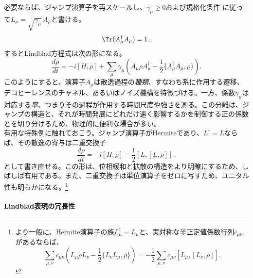 \documentclass[a4paper,11pt,oneside]{article}
\theoremstyle{definition}
\numberwithin{equation}{section}
\begin{document}
必要ならば、ジャンプ演算子を再スケールし、$\gamma_\mu\ge 0$および規格化条件
に従って$L_\mu=\sqrt{\gamma_\mu}\,A_\mu$と書ける。
\begin{equation}
\Tr(A^{\dagger}_{\mu}A_{\mu})=1 \,.
\end{equation}
するとLindblad方程式は次の形になる。
\begin{equation}
\frac{d\rho}{dt}
=
-i[H,\rho]
+
\sum_\mu \gamma_\mu
\left(
A_\mu \rho A_\mu^\dagger
-\frac12 \{A_\mu^\dagger A_\mu,\rho\}
\right) .
\end{equation}
このようにすると、演算子$A_\mu$は散逸過程の\textit{種類}、すなわち系に作用する遷移、デコヒーレンスのチャネル、あるいはノイズ機構を特徴づける。一方、係数$\gamma_\mu$は対応する\textit{率}、つまりその過程が作用する時間尺度や強さを測る。この分離は、ジャンプの構造と、それが時間発展にどれだけ速く影響するかを制御する正の係数とを切り分けるため、物理的に便利な場合が多い。\\





有用な特殊例に触れておこう。ジャンプ演算子がHermiteであり、$  L ^\dagger = L  $ならば、その散逸の寄与は二重交換子
\begin{equation}\label{doublecommutator}
\frac{d\rho}{dt}
=
-i[H,\rho]
-\frac12 
\left[L ,[L ,\rho]\right]\,.
\end{equation}
として書き直せる。この形は、位相緩和と拡散の構造をより明瞭にするため、しばしば有用である。また、二重交換子は単位演算子をゼロに写すため、ユニタル性も明らかになる。\footnote{より一般に、Hermite演算子の族$L_\mu^\dagger=L_\mu$と、実対称な半正定値係数行列$c_{\mu\nu}$があるならば、
\begin{equation}
\sum_{\mu,\nu} c_{\mu\nu}
\left(
L_\mu \rho L_\nu - \frac12\{L_\nu L_\mu,\rho\}
\right)
=
-\frac12
\sum_{\mu,\nu} c_{\mu\nu}[L_\mu,[L_\nu,\rho]] .
\end{equation}}




\paragraph{Lindblad表現の冗長性}
\end{document}
